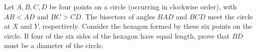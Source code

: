 Let $ A,B,C,D$ be four points on a circle (occurring in clockwise order), with $ AB<AD$ and $ BC>CD$. The bisectors of angles $ BAD$ and $ BCD$ meet the circle at $ X$ and $ Y$,  respectively. Consider the hexagon formed by these six points on the circle. If four of the six sides of the hexagon have equal length, prove that $ BD$ must be a diameter of the circle.